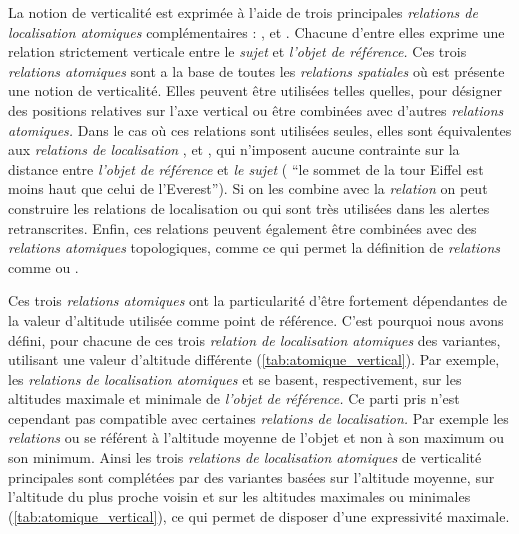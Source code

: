 La notion de verticalité est exprimée à l'aide de trois principales
\emph{relations de localisation atomiques} complémentaires :
,
 et
. Chacune
d'entre elles exprime une relation strictement verticale entre le
\emph{sujet} et \emph{l'objet de référence.} Ces trois \emph{relations
  atomiques} sont a la base de toutes les \emph{relations spatiales}
où est présente une notion de verticalité. Elles peuvent être
utilisées telles quelles, pour désigner des positions relatives sur
l'axe vertical ou être combinées avec d'autres \emph{relations
  atomiques.} Dans le cas où ces relations sont utilisées seules,
elles sont équivalentes aux \emph{relations de localisation}
,
 et
, qui n'imposent aucune contrainte sur
la distance entre \emph{l'objet de référence} et \emph{le sujet} (\eg
\enquote{le sommet de la tour Eiffel est moins haut que celui de
  l’Everest}). Si on les combine avec la \emph{relation}
 on peut construire les
relations de localisation  ou
 qui sont très utilisées dans
les alertes retranscrites. Enfin, ces relations peuvent également être
combinées avec des \emph{relations atomiques} topologiques, comme
 ce qui permet la définition de
\emph{relations} comme  ou
.

Ces trois \emph{relations atomiques} ont la particularité d'être
fortement dépendantes de la valeur d'altitude utilisée comme point de
référence. C'est pourquoi nous avons défini, pour chacune de ces trois
\emph{relation de localisation atomiques} des variantes, utilisant une
valeur d'altitude différente (\autoref{tab:atomique_vertical}). Par
exemple, les \emph{relations de localisation atomiques}
 et
 se
basent, respectivement, sur les altitudes maximale et minimale de
\emph{l'objet de référence.} Ce parti pris n'est cependant pas
compatible avec certaines \emph{relations de localisation.} Par
exemple les \emph{relations}
 ou
 se référent à l'altitude
moyenne de l'objet et non à son maximum ou son minimum. Ainsi les
trois \emph{relations de localisation atomiques} de verticalité
principales sont complétées par des variantes basées sur l'altitude
moyenne, sur l'altitude du plus proche voisin et sur les altitudes
maximales ou minimales (\autoref{tab:atomique_vertical}), ce qui
permet de disposer d'une expressivité maximale.

